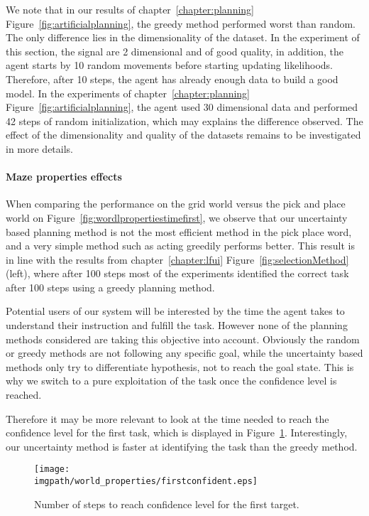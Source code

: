 We note that in our results of chapter~\ref{chapter:planning} Figure~\ref{fig:artificialplanning}, the greedy method performed worst than random. The only difference lies in the dimensionality of the dataset. In the experiment of this section, the signal are 2 dimensional and of good quality, in addition, the agent starts by 10 random movements before starting updating likelihoods. Therefore, after 10 steps, the agent has already enough data to build a good model. In the experiments of chapter~\ref{chapter:planning} Figure~\ref{fig:artificialplanning}, the agent used 30 dimensional data and performed 42 steps of random initialization, which may explains the difference observed. The effect of the dimensionality and quality of the datasets remains to be investigated in more details.

\paragraph{Maze properties effects}

When comparing the performance on the grid world versus the pick and place world on Figure~\ref{fig:wordlpropertiestimefirst}, we observe that our uncertainty based planning method is not the most efficient method in the pick place word, and a very simple method such as acting greedily performs better. This result is in line with the results from chapter~\ref{chapter:lfui} Figure~\ref{fig:selectionMethod} (left), where after 100 steps most of the experiments identified the correct task after 100 steps using a greedy planning method.

Potential users of our system will be interested by the time the agent takes to understand their instruction and fulfill the task. However none of the planning methods considered are taking this objective into account. Obviously the random or greedy methods are not following any specific goal, while the uncertainty based methods only try to differentiate hypothesis, not to reach the goal state. This is why we switch to a pure exploitation of the task once the confidence level is reached.

Therefore it may be more relevant to look at the time needed to reach the confidence level for the first task, which is displayed in Figure~\ref{fig:wordlpropertiesconfidencefirst}. Interestingly, our uncertainty method is faster at identifying the task than the greedy method.

\begin{figure}[!htbp]
\centering
\texttt{[image: \\imgpath/world\_properties/firstconfident.eps]}
\caption{Number of steps to reach confidence level for the first target.}
\label{fig:wordlpropertiesconfidencefirst}
\end{figure} 

